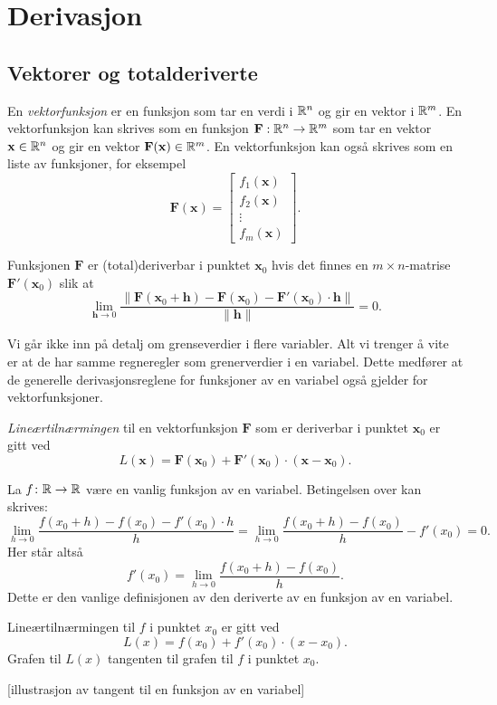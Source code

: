 \section{Derivasjon}
\subsection{Vektorer og totalderiverte}
\newcommand{\V}[1]{\mathbf{#1}}
En {\em vektorfunksjon} er en funksjon som tar en verdi i $\mathbb{R}^n$ og gir en
vektor i $\mathbb{R}^m$. En vektorfunksjon kan skrives som en funksjon
$\V{F}:\R^n\to\R^m$ som tar en vektor $\V{x}\in\R^n$ og gir en vektor
$\V{F}(\V{x})\in\R^m$. En vektorfunksjon kan også skrives som en liste av
funksjoner, for eksempel
$$\V{F}(\V{x}) = \begin{bmatrix} f_1(\V{x}) \\ f_2(\V{x}) \\ \vdots \\ f_m(\V{x}) \end{bmatrix}.$$

\begin{definisjon}
Funksjonen $\V{F}$ er (total)deriverbar i punktet $\V{x}_0$ hvis det finnes en $m \times n$-matrise $\V{F}'(\V{x}_0)$ slik at
$$\lim_{\V{h}\to 0} \frac{\|\V{F}(\V{x}_0+\V{h}) - \V{F}(\V{x}_0) -
\V{F}'(\V{x}_0) \cdot \V{h}\|}{\|\V{h}\|} = 0.$$
\end{definisjon}


Vi går ikke inn på detalj om grenseverdier i flere variabler. Alt vi trenger å
vite er at de har samme regneregler som
grenerverdier i en variabel.
Dette medfører at de generelle derivasjonsreglene for funksjoner av en variabel også gjelder for vektorfunksjoner.

\begin{definisjon}
  {\em Lineærtilnærmingen} til en vektorfunksjon $\V{F}$ som er deriverbar i punktet $\V{x}_0$ er
  gitt ved
  $$L(\V{x}) = \V{F}(\V{x}_0) + \V{F}'(\V{x}_0) \cdot (\V{x} - \V{x}_0).$$
\end{definisjon}

\begin{eksempel}
  La $f \colon \mathbb{R} \to \mathbb{R}$ være en vanlig funksjon av en variabel. Betingelsen over kan skrives:
  $$\lim_{h\to 0} \frac{f(x_0+h) - f(x_0) - f'(x_0) \cdot h}{h} =
  \lim_{h\to 0} \frac{f(x_0+h) - f(x_0)}{h} - f'(x_0) = 0.$$
  Her står altså 
  $$f'(x_0) = \lim_{h\to 0} \frac{f(x_0+h) - f(x_0)}{h}.$$
  Dette er den vanlige definisjonen av den deriverte av en funksjon av en variabel.

  Lineærtilnærmingen til $f$ i punktet $x_0$ er gitt ved
  $$L(x) = f(x_0) + f'(x_0) \cdot (x - x_0).$$
  Grafen til $L(x)$ tangenten til grafen til $f$ i punktet $x_0$.
\end{eksempel}
[illustrasjon av tangent til en funksjon av en variabel]

